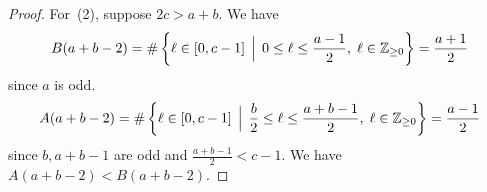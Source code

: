 \documentclass[10pt,a4paper]{amsart}
\def\Z{\mathbb{Z}}
\begin{document}
\begin{proof}
For~(2), suppose $2c > a+b$. We have 
$$B(a+b-2)= \# \left \{ \ell \in [0, c - 1] \, \Bigm|\, 0 \le \ell \le \frac{a -1}{2}, \; \ell \in \Z_{\geq 0} \right \}=\frac{a+1}{2}$$
since $a$ is odd. 
$$A(a+b-2)=\# \left \{ \ell \in [0, c - 1] \, \Bigm| \, \frac{b}{2} \le \ell  \le \frac{a+b-1}{2}, \; \ell \in \Z_{ \geq 0} \right \}=\frac{a-1}{2}$$
since $b, a+b-1$ are odd and $\frac{a+b-1}{2} < c-1$. We have $A(a+b-2)<B(a+b-2)$.

\end{proof}
\end{document}
